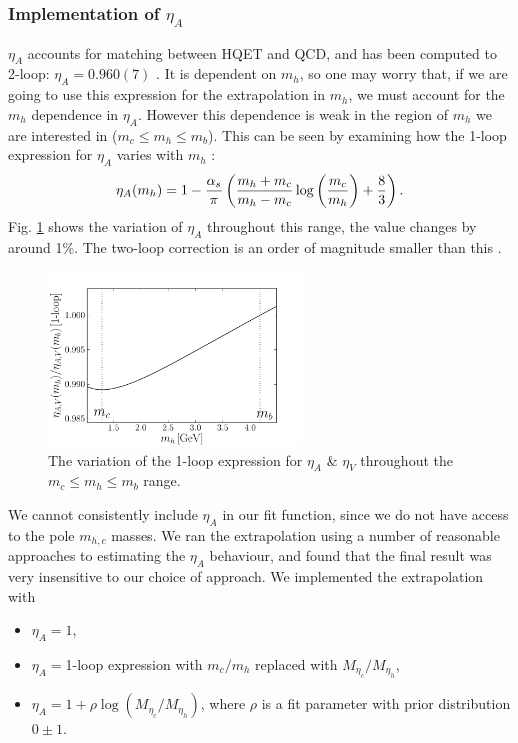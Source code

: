 \subsubsection{Implementation of $\eta_A$}

$\eta_A$ accounts for matching between HQET and QCD, and has been computed to 2-loop: $\eta_A = 0.960(7)$ \cite{PhysRevLett.76.4124}. It is dependent on $m_h$, so one may worry that, if we are going to use this expression for the extrapolation in $m_h$, we must account for the $m_h$ dependence in $\eta_A$. However this dependence is weak in the region of $m_h$ we are interested in ($m_c \leq m_h \leq m_b$). This can be seen by examining how the 1-loop expression for $\eta_A$ varies with $m_h$ \cite{CLOSE1984209}:
\begin{align}
  \eta_A(m_h) = 1 - {\alpha_s \over \pi} \left( {m_h+m_c\over m_h-m_c} \log\left({m_c\over m_h}\right) + {8\over 3} \right).
  \label{eq:etaA}
\end{align}
Fig. \ref{fig:etaAV} shows the variation of $\eta_A$ throughout this range, the value changes by around 1\%. The two-loop correction is an order of magnitude smaller than this \cite{PhysRevLett.76.4124}.

\begin{figure}[htb!]
  \begin{center}
  \includegraphics[width=0.6\textwidth]{images/BsDsstar/etaAV.pdf}
  \caption{The variation of the 1-loop expression for $\eta_{A}$ \& $\eta_V$ throughout the $m_c \leq m_h \leq m_b$ range. \label{fig:etaAV}}
  \end{center}
  \vspace{-10pt}
\end{figure}

We cannot consistently include $\eta_A$ in our fit function, since we do not have access to the pole $m_{h,c}$ masses. We ran the extrapolation using a number of reasonable approaches to estimating the $\eta_A$ behaviour, and found that the final result was very insensitive to our choice of approach. We implemented the extrapolation with
\begin{itemize}
\item
  $\eta_A=1$,
\item
  $\eta_A = $1-loop expression with $m_c/m_h$ replaced with $M_{\eta_c}/M_{\eta_h}$,
\item
  $\eta_A = 1 + \rho \log(M_{\eta_c}/M_{\eta_h})$, where $\rho$ is a fit parameter with prior distribution $0\pm 1$.
\end{itemize}

